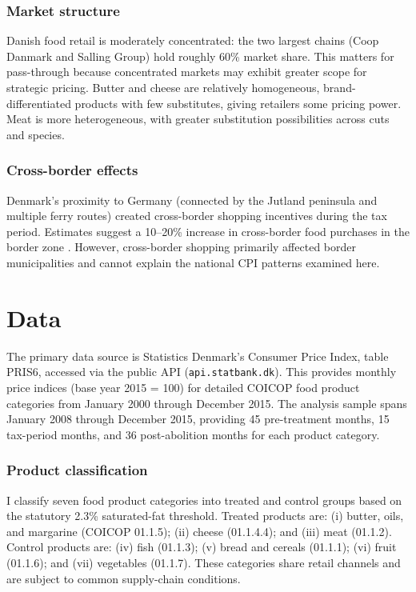 \documentclass[12pt]{article}
\begin{document}
\subsubsection*{Market structure} Danish food retail is moderately concentrated: the two largest chains (Coop Danmark and Salling Group) hold roughly 60\% market share. This matters for pass-through because concentrated markets may exhibit greater scope for strategic pricing. Butter and cheese are relatively homogeneous, brand-differentiated products with few substitutes, giving retailers some pricing power. Meat is more heterogeneous, with greater substitution possibilities across cuts and species.

\subsubsection*{Cross-border effects} Denmark's proximity to Germany (connected by the Jutland peninsula and multiple ferry routes) created cross-border shopping incentives during the tax period. Estimates suggest a 10--20\% increase in cross-border food purchases in the border zone \citep{smed2016}. However, cross-border shopping primarily affected border municipalities and cannot explain the national CPI patterns examined here.

\section{Data}

The primary data source is Statistics Denmark's Consumer Price Index, table PRIS6, accessed via the public API (\texttt{api.statbank.dk}). This provides monthly price indices (base year 2015 = 100) for detailed COICOP food product categories from January 2000 through December 2015. The analysis sample spans January 2008 through December 2015, providing 45 pre-treatment months, 15 tax-period months, and 36 post-abolition months for each product category.

\subsubsection*{Product classification} I classify seven food product categories into treated and control groups based on the statutory 2.3\% saturated-fat threshold. Treated products are: (i) butter, oils, and margarine (COICOP 01.1.5); (ii) cheese (01.1.4.4); and (iii) meat (01.1.2). Control products are: (iv) fish (01.1.3); (v) bread and cereals (01.1.1); (vi) fruit (01.1.6); and (vii) vegetables (01.1.7). These categories share retail channels and are subject to common supply-chain conditions.
\end{document}
